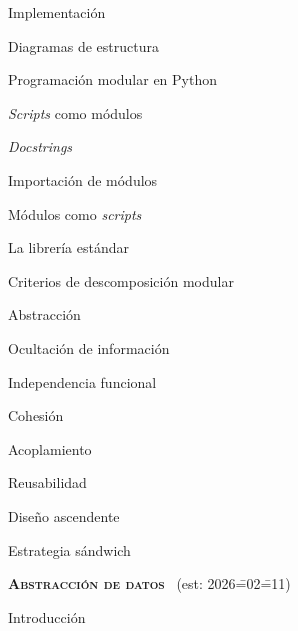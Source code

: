 \begin{longenum}
\begin{longenum}
\begin{longenum}
\begin{longenum}
\begin{longenum}
                \end{longenum}
                \item Implementación
            \end{longenum}
            \item Diagramas de estructura
        \end{longenum}
        \item Programación modular en Python
        \begin{longenum}
            \item \textit{Scripts} como módulos
            \begin{longenum}
                \item \textit{Docstrings}
            \end{longenum}
            \item Importación de módulos
            \item Módulos como \textit{scripts}
            \item La librería estándar
        \end{longenum}
        \item Criterios de descomposición modular
        \begin{longenum}
            \item Abstracción
            \item Ocultación de información
            \item Independencia funcional
            \begin{longenum}
                \item Cohesión
                \item Acoplamiento
            \end{longenum}
            \item Reusabilidad
            \begin{longenum}
                \item Diseño ascendente
                \item Estrategia sándwich
            \end{longenum}
        \end{longenum}
    \end{longenum}
    \item \textbf{\textsc{Abstracción de datos}} \ (est: 2026\==02\==11)
    \begin{longenum}
        \item Introducción
        \begin{longenum}

\end{longenum}
\end{longenum}
\end{longenum}
